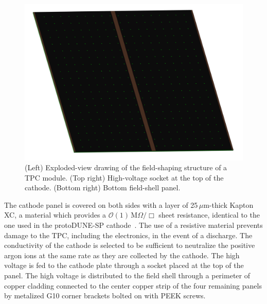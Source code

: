 \begin{figure}[htbp]
\begin{minipage}[b]{.4\textwidth}
\includegraphics[width=\linewidth]{graphics/lartpc/FieldCage/fcbottomtop.PNG}
\end{minipage}
\caption{(Left) Exploded-view drawing of the field-shaping structure of a TPC module. (Top right) High-voltage socket at the top of the cathode. (Bottom right) Bottom field-shell panel.}
\label{fig:field_shell}
\end{figure}

The cathode panel is covered on both sides with a layer of 25\,$\mu$m-thick Kapton XC, a material which provides a $\mathcal{O}(1)\,$M$\Omega/\Box$ sheet resistance, identical to the one used in the protoDUNE-SP cathode~\cite{protodune-sp_tdr}. The use of a resistive material prevents damage to the TPC, including the electronics, in the event of a discharge. The conductivity of the cathode is selected to be sufficient to neutralize the positive argon ions at the same rate as they are collected by the cathode. The high voltage is fed to the cathode plate through a socket placed at the top of the panel. The high voltage is distributed to the field shell through a perimeter of copper cladding connected to the center copper strip of the four remaining panels by metalized G10 corner brackets bolted on with PEEK screws.

